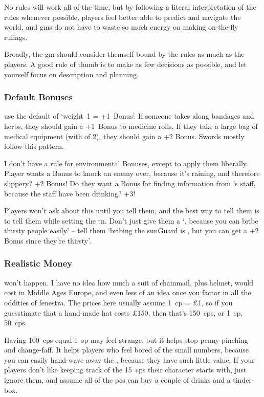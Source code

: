 \begin{multicols}{2}
No rules will work all of the time, but by following a literal interpretation of the rules whenever possible, players feel better able to predict and navigate the world, and \glspl{gm} do not have to waste so much energy on making on-the-fly rulings.

Broadly, the \gls{gm} should consider themself bound by the rules as much as the players.
A good rule of thumb is to make as few decisions as possible, and let yourself focus on description and planning.

\subsubsection{Default Bonuses}
use the default of `\gls{weight}~1 = +1~Bonus'.
If someone takes along bandages and herbs, they should gain a +1~Bonus to medicine rolls.
If they take a large bag of medical equipment (with  of 2), they should gain a +2 Bonus.
Swords mostly follow this pattern.

I don't have a rule for environmental Bonuses, except to apply them liberally.
Player wants a Bonus to knock an enemy over, because it's raining, and therefore slippery?
+2 Bonus!
Do they want a Bonus for finding information from 's staff, because the staff have been drinking?
+3!

Players won't ask about this until you tell them, and the best way to tell them is to tell them while setting the \gls{tn}.
Don't just give them a `\tn[8], because you can bribe thirsty people easily' -- tell them `bribing the \gls{sunGuard} is \tn[10], but you can get a +2 Bonus since they're thirsty'.

\subsubsection{Realistic Money}
won't happen.
I have no idea how much a suit of chainmail, plus helmet, would cost in Middle Ages Europe, and even less of an idea once you factor in all the oddities of \gls{fenestra}.
The prices here usually assume 1~\gls{cp} = \pounds1, so if you guesstimate that a hand-made hat costs \pounds150, then that's 150~\glspl{cp}, or 1~\gls{sp}, 50~\glspl{cp}.

Having 100~\glspl{cp} equal 1~\gls{sp} may feel strange, but it helps stop penny-pinching and change-faff.
It helps players who feel bored of the small numbers, because you can easily hand-wave away the , because they have such little value.
If your players don't like keeping track of the 15~\glspl{cp} their character starts with, just ignore them, and assume all of the \glspl{pc} can buy a couple of drinks and a tinder-box.


\end{multicols}
